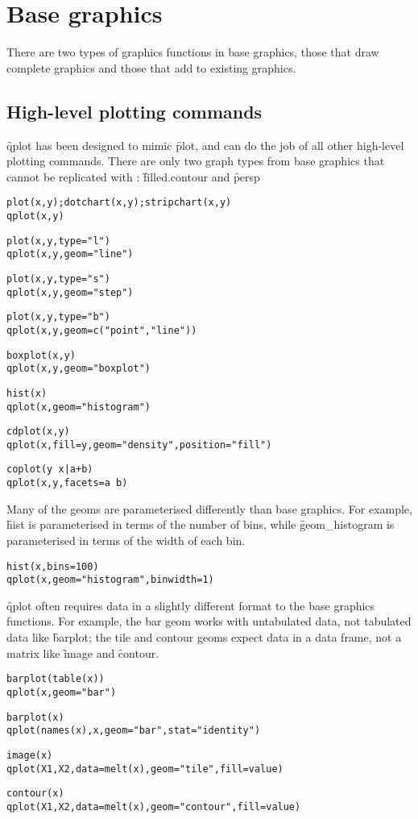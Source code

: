 \section{Base graphics}
\label{sec:translate-base}

There are two types of graphics functions in base graphics, those that draw complete graphics and those that add to existing graphics.  

\subsection{High-level plotting commands}

\f{qplot} has been designed to mimic \f{plot}, and can do the job of all other high-level plotting commands.  There are only two graph types from base graphics that cannot be replicated with \ggplot: \f{filled.contour} and \f{persp}

\begin{alltt}
plot(x, y);  dotchart(x, y); stripchart(x, y)
qplot(x, y)

plot(x, y, type = "l")
qplot(x, y, geom = "line")

plot(x, y, type = "s")
qplot(x, y, geom = "step")

plot(x, y, type = "b")
qplot(x, y, geom = c("point", "line"))

boxplot(x, y)
qplot(x, y, geom = "boxplot")

hist(x)
qplot(x, geom = "histogram")

cdplot(x, y)
qplot(x, fill = y, geom = "density", position = "fill")

coplot(y ~ x | a + b)
qplot(x, y, facets = a ~ b)
\end{alltt}

Many of the geoms are parameterised differently than base graphics.  For example, \f{hist} is parameterised in terms of the number of bins, while \f{geom_histogram} is parameterised in terms of the width of each bin.  

\begin{alltt}
hist(x, bins = 100)
qplot(x, geom = "histogram", binwidth = 1)
\end{alltt}

\f{qplot} often requires data in a slightly different format to the base graphics functions.  For example, the bar geom works with untabulated data, not tabulated data like \f{barplot}; the tile and contour geoms expect data in a data frame, not a matrix like \f{image} and \f{contour}.

\begin{alltt}
barplot(table(x))
qplot(x, geom = "bar")

barplot(x)
qplot(names(x), x, geom = "bar", stat = "identity")

image(x)
qplot(X1, X2, data = melt(x), geom = "tile", fill = value)

contour(x)
qplot(X1, X2, data = melt(x), geom = "contour", fill = value)
\end{alltt}

